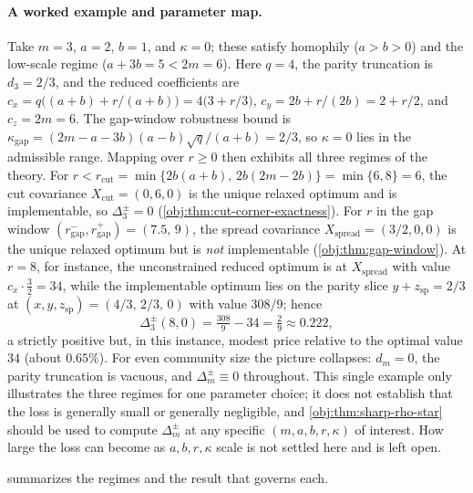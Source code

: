 \paragraph{A worked example and parameter map.} Take \(m=3\), \(a=2\), \(b=1\), and \(\kappa=0\); these satisfy homophily (\(a>b>0\)) and the low-scale regime (\(a+3b=5<2m=6\)). Here \(q=4\), the parity truncation is \(d_3=2/3\), and the reduced coefficients are \(c_x=q\bigl((a+b)+r/(a+b)\bigr)=4\bigl(3+r/3\bigr)\), \(c_y=2b+r/(2b)=2+r/2\), and \(c_z=2m=6\). The gap-window robustness bound is \(\kappa_{\mathrm{gap}}=(2m-a-3b)(a-b)\sqrt q/(a+b)=2/3\), so \(\kappa=0\) lies in the admissible range. Mapping over \(r\ge0\) then exhibits all three regimes of the theory. For \(r<r_{\mathrm{cut}}=\min\{2b(a+b),\,2b(2m-2b)\}=\min\{6,8\}=6\), the cut covariance \(X_{\mathrm{cut}}=(0,6,0)\) is the unique relaxed optimum and is implementable, so \(\Delta_3^{\pm}=0\) (\cref{obj:thm:cut-corner-exactness}). For \(r\) in the gap window \((r_{\mathrm{gap}}^-,r_{\mathrm{gap}}^+)=(7.5,\,9)\), the spread covariance \(X_{\mathrm{spread}}=(3/2,0,0)\) is the unique relaxed optimum but is \emph{not} implementable (\cref{obj:thm:gap-window}). At \(r=8\), for instance, the unconstrained reduced optimum is at \(X_{\mathrm{spread}}\) with value \(c_x\cdot\tfrac32=34\), while the implementable optimum lies on the parity slice \(y+z_{\mathrm{sp}}=2/3\) at \((x,y,z_{\mathrm{sp}})=(4/3,\,2/3,\,0)\) with value \(308/9\); hence
\[
\Delta_3^{\pm}(8,0)=\tfrac{308}{9}-34=\tfrac29\approx0.222,
\]
a strictly positive but, in this instance, modest price relative to the optimal value \(34\) (about \(0.65\%\)). For even community size the picture collapses: \(d_m=0\), the parity truncation is vacuous, and \(\Delta_m^{\pm}\equiv0\) throughout. This single example only illustrates the three regimes for one parameter choice; it does not establish that the loss is generally small or generally negligible, and \cref{obj:thm:sharp-rho-star} should be used to compute \(\Delta_m^{\pm}\) at any specific \((m,a,b,r,\kappa)\) of interest. How large the loss can become as \(a,b,r,\kappa\) scale is not settled here and is left open.

 summarizes the regimes and the result that governs each.

